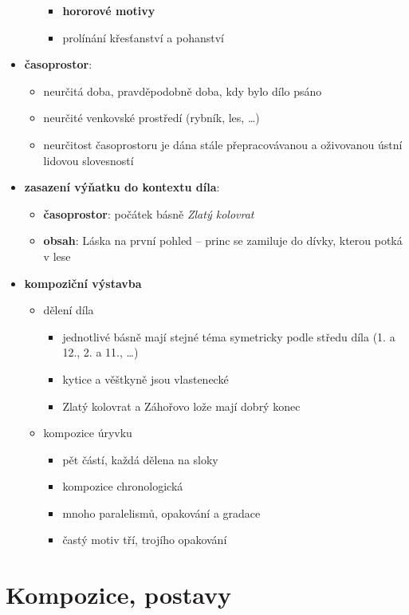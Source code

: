 \documentclass[10pt,a4paper]{article}
\begin{document}
\begin{itemize}
\begin{itemize}
\begin{itemize}
		\item \textbf{hororové motivy}
		\item prolínání křesťanství a pohanství
		\end{itemize}
	\end{itemize}
\item \textbf{časoprostor}: 
	\begin{itemize}
	\item neurčitá doba, pravděpodobně doba, kdy bylo dílo psáno
	\item neurčité venkovské prostředí (rybník, les, \ldots)
	\item neurčitost časoprostoru je dána stále přepracovávanou a oživovanou ústní lidovou slovesností
	\end{itemize}
\item \textbf{zasazení výňatku do kontextu díla}:
	\begin{itemize}
	\item \textbf{časoprostor}: počátek básně \textit{Zlatý kolovrat}
	\item \textbf{obsah}: Láska na první pohled -- princ se zamiluje do dívky, kterou potká v lese
	\end{itemize}
\item \textbf{kompoziční výstavba}
	\begin{itemize}
	\item dělení díla
		\begin{itemize}
		\item jednotlivé básně mají stejné téma symetricky podle středu díla (1. a 12., 2. a 11., \ldots)
		\item kytice a věštkyně jsou vlastenecké
		\item Zlatý kolovrat a Záhořovo lože mají dobrý konec
		\end{itemize}
	\item kompozice úryvku
		\begin{itemize}
		\item pět částí, každá dělena na sloky
		\item kompozice chronologická
		\item mnoho paralelismů, opakování a gradace
		\item častý motiv tří, trojího opakování
		\end{itemize}
	\end{itemize}
\end{itemize}
\section*{Kompozice, postavy}
\end{document}
